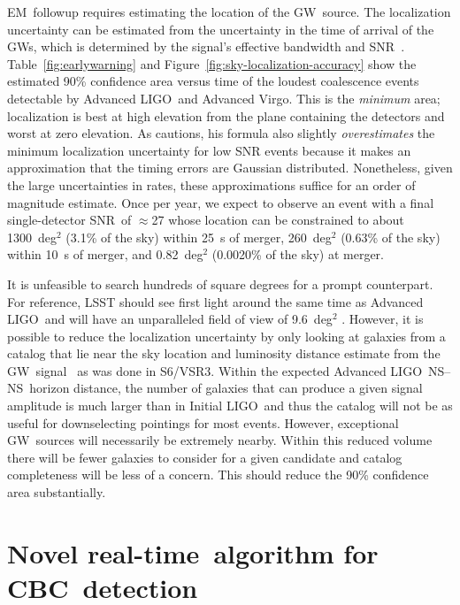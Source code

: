 \documentclass[preprint2]{aastex}
\newcommand{\NS}{NS}
\newcommand{\GW}{GW}%
\newcommand{\EM}{EM}%
\newcommand{\CBC}{CBC}%
\newcommand{\LIGO}{LIGO}%
\newcommand{\SNR}{SNR}%
\newcommand{\realtime}{real-time}
\begin{document}
\EM\ followup requires estimating the location of the \GW\ source. The localization
uncertainty can be estimated from the uncertainty in the time of arrival of the \GW{}s,
which is determined by the signal's effective bandwidth and \SNR\
\citep{Fairhurst2009}.  Table~\ref{fig:earlywarning} and
Figure~\ref{fig:sky-localization-accuracy} show the estimated 90\%
confidence area versus time of the loudest coalescence events detectable by
Advanced \LIGO\ and Advanced Virgo.  This is the \emph{minimum} area; localization
is best at high elevation from the plane containing the detectors and worst at zero elevation.
As \citeauthor{Fairhurst2009} cautions, his formula also slightly \emph{overestimates} the minimum localization uncertainty for low SNR events because it makes an approximation that the timing errors are Gaussian distributed.  Nonetheless, given the large uncertainties in rates, these approximations suffice for an order of magnitude estimate.
Once per year, we expect to observe an
event with a final single-detector \SNR\ of $\approx$27 whose location can be constrained to about
1300~deg$^2$ (3.1\% of the sky) within 25~s of merger,
260~deg$^2$ (0.63\% of the sky) within 10~s of merger, and
0.82~deg$^2$ (0.0020\% of the sky) at merger.

It is unfeasible to search hundreds of square degrees for a prompt counterpart.
For reference, LSST should see first light around the same time as
Advanced \LIGO\ and will have an unparalleled field of view of 9.6~deg$^2$
\citep{2008arXiv0805.2366I}.  However, 
it is possible to reduce the localization uncertainty by only looking at
galaxies from a catalog that lie near the sky location and luminosity distance
estimate from the \GW\ signal~\citep{galaxy-catalog} as was done in S6/VSR3.
Within the expected Advanced \LIGO\ \NS--\NS\ horizon distance,
the number of galaxies that can produce a given signal amplitude is much larger
than in Initial \LIGO\ and thus the catalog will not be as useful
for downselecting pointings for most events. However, exceptional \GW\ sources will
necessarily be extremely nearby. Within this reduced volume there will be fewer
galaxies to consider for a given candidate and catalog completeness will be
less of a concern.  This should reduce the 90\% confidence area substantially.

\section{Novel \realtime\ algorithm for \CBC\ detection}
\label{sec:method}
\end{document}
